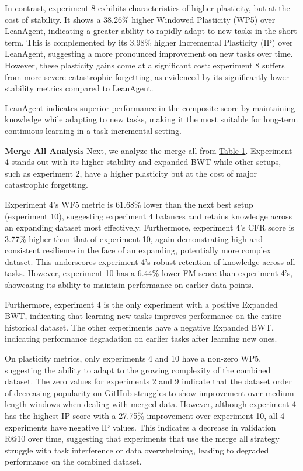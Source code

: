 \documentclass{article} %
\begin{document}
In contrast, experiment 8 exhibits characteristics of higher plasticity, but at the cost of stability. It shows a 38.26\% higher Windowed Plasticity (WP5) over LeanAgent, indicating a greater ability to rapidly adapt to new tasks in the short term. This is complemented by its 3.98\% higher Incremental Plasticity (IP) over LeanAgent, suggesting a more pronounced improvement on new tasks over time. However, these plasticity gains come at a significant cost: experiment 8 suffers from more severe catastrophic forgetting, as evidenced by its significantly lower stability metrics compared to LeanAgent.

LeanAgent indicates superior performance in the composite score by maintaining knowledge while adapting to new tasks, making it the most suitable for long-term continuous learning in a task-incremental setting.

\textbf{Merge All Analysis} Next, we analyze the merge all from \hyperref[tab:merge-all-experiment-metrics]{Table 1}. Experiment 4 stands out with its higher stability and expanded BWT while other setups, such as experiment 2, have a higher plasticity but at the cost of major catastrophic forgetting.

Experiment 4's WF5 metric is 61.68\% lower than the next best setup (experiment 10), suggesting experiment 4 balances and retains knowledge across an expanding dataset most effectively. Furthermore, experiment 4's CFR score is 3.77\% higher than that of experiment 10, again demonstrating high and consistent resilience in the face of an expanding, potentially more complex dataset. This underscores experiment 4's robust retention of knowledge across all tasks. However, experiment 10 has a 6.44\% lower FM score than experiment 4's, showcasing its ability to maintain performance on earlier data points.

Furthermore, experiment 4 is the only experiment with a positive Expanded BWT, indicating that learning new tasks improves performance on the entire historical dataset. The other experiments have a negative Expanded BWT, indicating performance degradation on earlier tasks after learning new ones.

On plasticity metrics, only experiments 4 and 10 have a non-zero WP5, suggesting the ability to adapt to the growing complexity of the combined dataset. The zero values for experiments 2 and 9 indicate that the dataset order of decreasing popularity on GitHub struggles to show improvement over medium-length windows when dealing with merged data. However, although experiment 4 has the highest IP score with a 27.75\% improvement over experiment 10, all 4 experiments have negative IP values. This indicates a decrease in validation R@10 over time, suggesting that experiments that use the merge all strategy struggle with task interference or data overwhelming, leading to degraded performance on the combined dataset.
\end{document}
